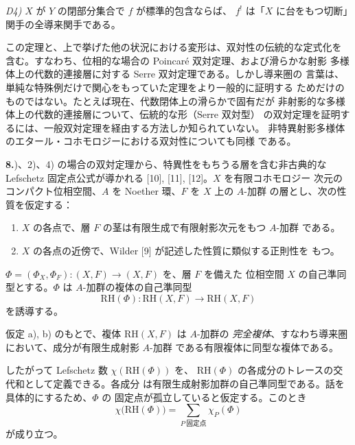 \clearpage
{}
\noindent\textit{D4)} $X$ が $Y$ の閉部分集合で $f$ が標準的包含ならば、
$f^!$ は「$X$ に台をもつ切断」関手の全導来関手である。

この定理と、上で挙げた他の状況における変形は、双対性の伝統的な定式化を
含む。すなわち、位相的な場合の Poincaré 双対定理、および滑らかな射影
多様体上の代数的連接層に対する Serre 双対定理である。しかし導来圏の
言葉は、単純な特殊例だけで関心をもっていた定理をより一般的に証明する
ためだけのものではない。たとえば現在、代数閉体上の滑らかで固有だが
非射影的な多様体上の代数的連接層について、伝統的な形（Serre 双対型）
の双対定理を証明するには、一般双対定理を経由する方法しか知られていない。
非特異射影多様体のエタール・コホモロジーにおける双対性についても同様
である。

\noindent\textbf{8.})、2)、4) の場合の双対定理から、特異性をもちうる層を含む非古典的な
Lefschetz 固定点公式が導かれる [10], [11], [12]。$X$ を有限コホモロジー
次元のコンパクト位相空間、$A$ を Noether 環、$F$ を $X$ 上の $A$-加群
の層とし、次の性質を仮定する：

\begin{enumerate}
\renewcommand{\labelenumi}{\alph{enumi})}
\item $X$ の各点で、層 $F$ の茎は有限生成で有限射影次元をもつ $A$-加群
である。

\item $X$ の各点の近傍で、Wilder [9] が記述した性質に類似する正則性を
もつ。
\end{enumerate}

$\Phi=(\Phi_X,\Phi_F)\colon(X,F)\longrightarrow(X,F)$ を、層 $F$ を備えた
位相空間 $X$ の自己準同型とする。$\Phi$ は $A$-加群の複体の自己準同型
\[
\mathrm{RH}(\Phi)\colon
\mathrm{RH}(X,F)\longrightarrow\mathrm{RH}(X,F)
\]
を誘導する。

仮定 a), b) のもとで、複体 $\mathrm{RH}(X,F)$ は $A$-加群の
\emph{完全複体}、すなわち導来圏において、成分が有限生成射影 $A$-加群
である有限複体に同型な複体である。

したがって Lefschetz 数 $\chi(\mathrm{RH}(\Phi))$ を、
$\mathrm{RH}(\Phi)$ の各成分のトレースの交代和として定義できる。各成分
は有限生成射影加群の自己準同型である。話を具体的にするため、$\Phi$ の
固定点が孤立していると仮定する。このとき
\begingroup
\makeatletter
\tagsleft@true
\let\veqno\@@leqno
\makeatother
\begin{equation}
\chi\bigl(\mathrm{RH}(\Phi)\bigr)
=\sum_{P\ \text{固定点}}\chi_P(\Phi)
\tag{Lef}
\end{equation}
\endgroup
が成り立つ。
